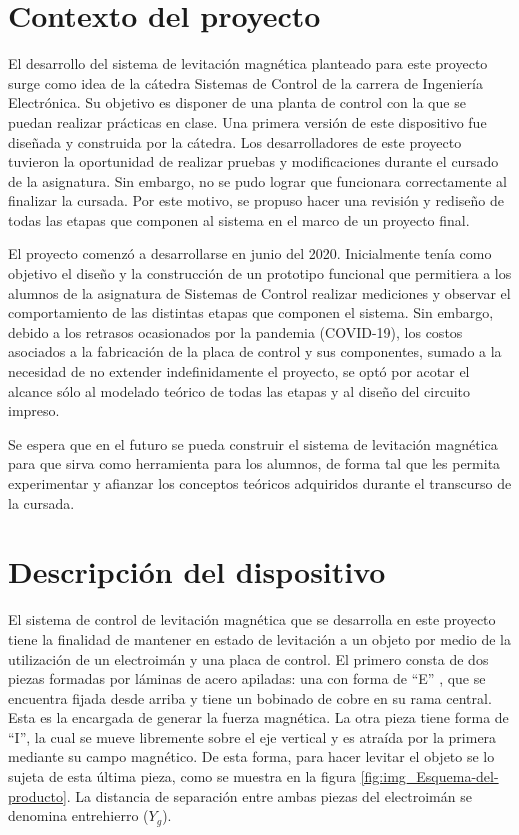 \section{Contexto del proyecto}

El desarrollo del sistema de levitación magnética planteado para este proyecto surge como idea de la cátedra Sistemas de Control de la carrera de Ingeniería Electrónica. Su objetivo es disponer de una planta de control con la  que se puedan realizar prácticas en clase. Una primera versión de este dispositivo fue diseñada y construida por la cátedra. Los desarrolladores de este proyecto tuvieron la oportunidad de realizar pruebas y modificaciones durante el cursado de la asignatura. Sin embargo, no se pudo lograr que funcionara correctamente al finalizar la cursada. Por este motivo, se propuso hacer una revisión y rediseño de todas las etapas que componen al sistema en el marco de un proyecto final.

El proyecto comenzó a desarrollarse en junio del 2020. Inicialmente tenía como objetivo el diseño y la construcción de un prototipo funcional que permitiera a los alumnos de la asignatura de Sistemas de Control realizar mediciones y observar el comportamiento de las distintas etapas que componen el sistema. Sin embargo, debido a los retrasos ocasionados por la pandemia (COVID-19), los costos asociados a la fabricación de la placa de control y sus componentes, sumado a la  necesidad de no extender indefinidamente el proyecto, se optó por acotar el alcance sólo al modelado teórico de todas las etapas y al diseño del circuito impreso.

Se espera que en el futuro se pueda construir el sistema de levitación magnética para que sirva como herramienta para los alumnos, de forma tal que les permita experimentar y afianzar los conceptos teóricos adquiridos durante el transcurso de la cursada.


\section{Descripción del dispositivo}\label{sec_descripcion-del-dispositivo}
El sistema de control de levitación magnética que se desarrolla en este proyecto tiene la finalidad de mantener en estado de levitación a un objeto por medio de la utilización de un electroimán y una placa de control. El primero consta de dos piezas formadas por láminas de acero apiladas: una con forma de “E” , que se encuentra fijada desde arriba y tiene un bobinado de cobre en su rama central. Esta es la encargada de generar la fuerza magnética. La otra pieza tiene forma de “I”, la cual se mueve libremente sobre el eje vertical y es atraída por la primera mediante su campo magnético. De esta forma, para hacer levitar el objeto se lo sujeta de esta última pieza, como se muestra en la figura \ref{fig:img_Esquema-del-producto}. La distancia de separación entre ambas piezas del electroimán se denomina entrehierro ($Y_{g}$).

